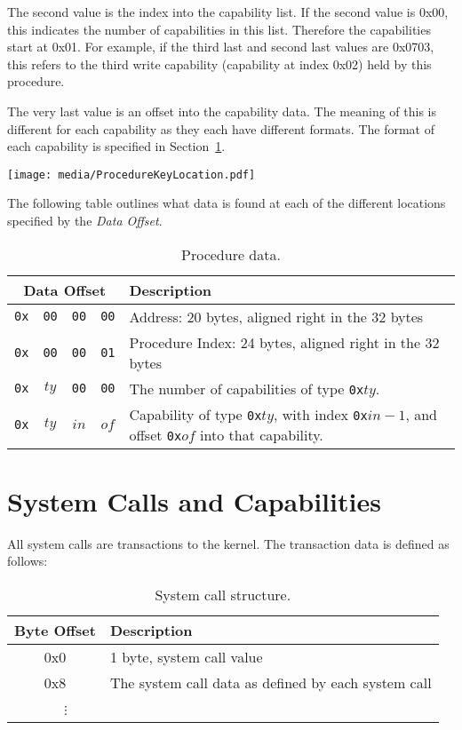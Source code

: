 \documentclass[english,a4paper]{article}
\begin{document}
The second value is the index into the capability list. If the second value is
0x00, this indicates the number of capabilities in this list. Therefore the
capabilities start at 0x01. For example, if the third last and second last
values are 0x0703, this refers to the third write capability (capability at
index 0x02) held by this procedure.

The very last value is an offset into the capability data. The meaning of this
is different for each capability as they each have different formats. The format
of each capability is specified in Section~\ref{syscalls-and-caps}.

\texttt{[image: media/ProcedureKeyLocation.pdf]}

The following table outlines what data is found at each of the different
locations specified by the \emph{Data Offset}.

\begin{table}[H]
  \caption{Procedure data.}
  \centering{}%
  \begin{tabularx}{\textwidth}{c | c | c | c | X }
    \hline
    \multicolumn{4}{c|}{Data Offset} & Description \\
    \hline
    \hline
    \texttt{0x} & \texttt{00} & \texttt{00} & \texttt{00} & Address: 20 bytes,
      aligned right in the 32 bytes \\
    \texttt{0x} & \texttt{00} & \texttt{00} & \texttt{01} & Procedure Index: 24 bytes,
      aligned right in the 32 bytes \\
    \texttt{0x} & \texttt{$ty$} & \texttt{00} & \texttt{00} & The number of
      capabilities of type \texttt{0x$ty$}. \\
    \texttt{0x} & \texttt{$ty$} & \texttt{$in$} & \texttt{$of$} & Capability of
      type \texttt{0x$ty$}, with index \texttt{0x$in-1$}, and offset
      \texttt{0x$of$} into that capability. \\
    \hline
  \end{tabularx}
\end{table}

\section{System Calls and Capabilities}\label{syscalls-and-caps}
All system calls are transactions to the kernel. The transaction data is defined
as follows:

\begin{table}[H]
  \caption{System call structure.}
  \centering{}%
  \begin{tabularx}{\textwidth}{c|X}
    \hline
    Byte Offset & Description\\
    \hline
    \hline
    0x0 & 1 byte, system call value \\
    0x8 & The system call data as defined by each system call \\
    ~~~$\vdots$ &  \\
    \hline
  \end{tabularx}
\end{table}
\end{document}
